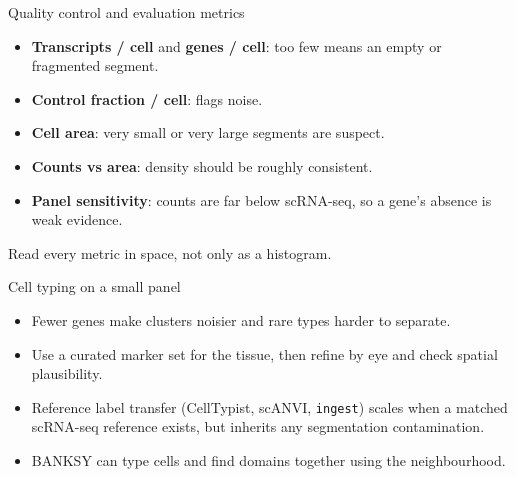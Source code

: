 \documentclass[aspectratio=169]{beamer}
\begin{document}
\begin{frame}{Quality control and evaluation metrics}
  \begin{itemize}
    \item \textbf{Transcripts / cell} and \textbf{genes / cell}: too few means an
      empty or fragmented segment.
    \item \textbf{Control fraction / cell}: flags noise.
    \item \textbf{Cell area}: very small or very large segments are suspect.
    \item \textbf{Counts vs area}: density should be roughly consistent.
    \item \textbf{Panel sensitivity}: counts are far below scRNA-seq, so a gene's
      absence is weak evidence.
  \end{itemize}
  Read every metric in space, not only as a histogram.
\end{frame}

\begin{frame}{Cell typing on a small panel}
  \begin{itemize}
    \item Fewer genes make clusters noisier and rare types harder to separate.
    \item Use a curated marker set for the tissue, then refine by eye and check
      spatial plausibility.
    \item Reference label transfer (CellTypist, scANVI, \texttt{ingest}) scales when
      a matched scRNA-seq reference exists, but inherits any segmentation
      contamination.
    \item BANKSY can type cells and find domains together using the neighbourhood.
  \end{itemize}
\end{frame}
\end{document}
